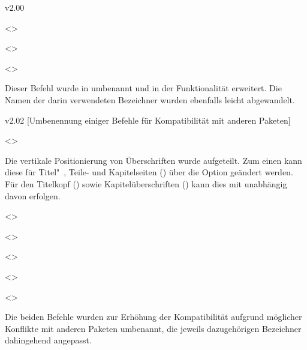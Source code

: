 \begin{NoIndexDefault}
\begin{Cessations}{v2.00}
\begin{Entity}{}
\begin{Cessation}
  {}
  <>
\begin{Cessation}
  {}
  <>
\begin{Cessation}
  {}
  <>
\printdeclarationlist

Dieser Befehl wurde in  umbenannt und in der Funktionalität 
erweitert. Die Namen der darin verwendeten Bezeichner wurden ebenfalls leicht 
abgewandelt.
\end{Cessation}
\end{Cessation}
\end{Cessation}
\end{Entity}
\end{Cessations}



\begin{Cessations}{v2.02}
  [Umbenennung einiger Befehle für Kompatibilität mit anderen Paketen]
\begin{Cessation}
  {}
  <>
\printdeclarationlist

Die vertikale Positionierung von Überschriften wurde aufgeteilt. Zum einen kann 
diese für Titel"~, Teile- und Kapitelseiten () über 
die Option  geändert werden. Für den Titelkopf
() sowie Kapitelüberschriften 
() kann dies mit  unabhängig 
davon erfolgen.
\end{Cessation}

\begin{Cessation}
  {}
  <>
\begin{Cessation}
  {}
  <>
\begin{Cessation}
  {}
  <>
\begin{Cessation}
  {}
  <>
\begin{Cessation}
  {}
  <>
\printdeclarationlist

Die beiden Befehle wurden zur Erhöhung der Kompatibilität aufgrund möglicher 
Konflikte mit anderen Paketen umbenannt, die jeweils dazugehörigen Bezeichner 
dahingehend angepasst.
\end{Cessation}
\end{Cessation}
\end{Cessation}
\end{Cessation}
\end{Cessation}


\end{Cessations}
\end{NoIndexDefault}
